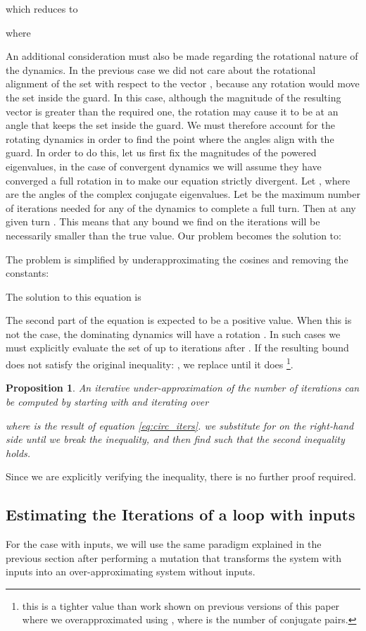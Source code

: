\documentclass{IEEEtran}
\newtheorem{proposition}{Proposition}
\begin{document}
which reduces to

where


An additional consideration must also be made regarding the rotational nature of the dynamics. In the previous case we did not care about the rotational alignment of the set  with respect to the vector , because any rotation would move the set inside the guard. In this case, although the magnitude of the resulting vector is greater than the required one, the rotation may cause it to be at an angle that keeps the set inside the guard. 
We must therefore account for the rotating dynamics in order to find the point where the angles align with the guard. In order to do this, let us first fix the magnitudes of the powered eigenvalues, in the case of convergent dynamics we will assume they have converged a full rotation in  to make our equation strictly divergent. Let , where  are the angles of the complex conjugate eigenvalues. Let  be the maximum number of iterations needed for any of the dynamics to complete a full turn. Then at any given turn .
This means that any bound we find on the iterations will be necessarily smaller than the true value. Our problem becomes the solution to:

The problem is simplified by underapproximating the cosines and removing the constants:

The solution to this equation is 

The second part of the equation is expected to be a positive value. When this is not the case, the dominating dynamics will have a rotation . In such cases we must explicitly evaluate the set of up to  iterations after .
If the resulting bound does not satisfy the original inequality: , we replace  until it does \footnote{this is a tighter value than work shown on previous versions of this paper where we overapproximated using , where  is the number of conjugate pairs.}.

\begin{proposition}\label{prop:real_under_n}
  An iterative under-approximation of the number of iterations  can
  be computed by starting with  and iterating over

where  is the result of equation \eqref{eq:circ_iters}.
we substitute for  on the right-hand side until we break the inequality, and then find  such that the second inequality holds.
\end{proposition}
Since we are explicitly verifying the inequality, there is no further proof required.
\subsection{Estimating the Iterations of a loop with inputs} \label{sec:guards_inputs}
For the case with inputs, we will use the same paradigm explained in the previous section after performing a mutation that transforms the system with inputs into an over-approximating system without inputs.
\end{document}
